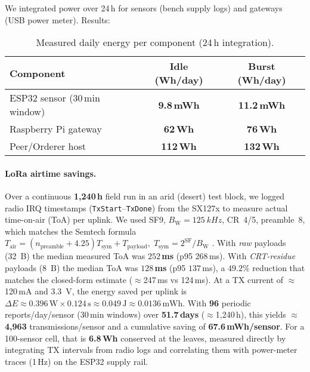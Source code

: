 \documentclass[12pt,onecolumn]{IEEEtran} %
\begin{document}
We integrated power over 24\,h for sensors (bench supply logs) and gateways (USB power meter). Results:

\begin{table}[htbp]
  \centering
  \caption{Measured daily energy per component (24\,h integration).}
  \label{tab:energy}
  \small
  \begin{tabular}{lcc}
    \toprule
    \textbf{Component} & \textbf{Idle (Wh/day)} & \textbf{Burst (Wh/day)} \\
    \midrule
    ESP32 sensor (30\,min window) & \textbf{9.8\,mWh} & \textbf{11.2\,mWh} \\
    Raspberry Pi gateway & \textbf{62\,Wh} & \textbf{76\,Wh} \\
    Peer/Orderer host & \textbf{112\,Wh} & \textbf{132\,Wh} \\
    \bottomrule
  \end{tabular}
\end{table}
\paragraph{LoRa airtime savings.}
Over a continuous \textbf{1{,}240\,h} field run in an arid (desert) test block, we logged radio IRQ timestamps (\texttt{TxStart}--\texttt{TxDone}) from the SX127x to measure actual time-on-air (ToA) per uplink. We used SF9, $B_{\mathrm{W}}{=}\SI{125}{kHz}$, CR~4/5, preamble~8, which matches the Semtech formula
\(
T_{\text{air}} = (n_{\text{preamble}}{+}4.25)T_{\text{sym}} + T_{\text{payload}},\;
T_{\text{sym}} = 2^{\mathrm{SF}}/B_{\mathrm{W}}
\)
\cite{mobilefish_lora_tutorial_2016}. With \emph{raw} payloads (\SI{32}{B}) the median measured ToA was
\textbf{$252$\,ms} (p95 $268$\,ms). With \emph{CRT-residue} payloads (\SI{8}{B}) the median ToA was \textbf{$128$\,ms} (p95 $137$\,ms), a \textbf{$49.2\%$} reduction that matches the closed-form estimate (\(\approx\)247\,ms vs 124\,ms). At a TX current of \(\approx\)120\,mA and \SI{3.3}{V}, the energy saved per uplink is
\(\Delta E \approx 0.396\,\text{W}\times 0.124\,\text{s} \approx 0.049\,\text{J} \approx 0.0136\,\text{mWh}\).
With \textbf{96} periodic reports/day/sensor (30\,min windows) over \textbf{51.7\,days} (\(\approx\)1{,}240\,h), this yields \(\approx\)\textbf{4{,}963} transmissions/sensor and a cumulative saving of \textbf{67.6\,mWh/sensor}. For a 100-sensor cell, that is \textbf{6.8\,Wh} conserved at the leaves, measured directly by integrating TX intervals from radio logs and correlating them with power-meter traces (1\,Hz) on the ESP32 supply rail.
\end{document}
